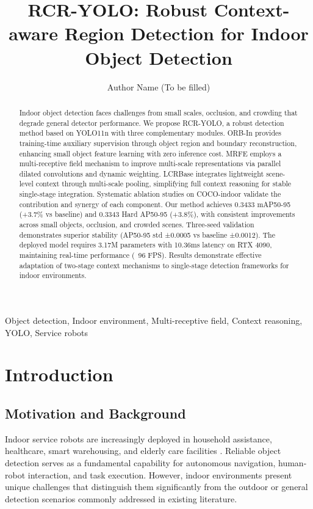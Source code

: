 \documentclass[journal]{IEEEtran}
\title{RCR-YOLO: Robust Context-aware Region Detection for Indoor Object Detection}
\author{Author Name (To be filled)}
\begin{document}
\maketitle

\begin{abstract}
Indoor object detection faces challenges from small scales, occlusion, and crowding that degrade general detector performance. We propose RCR-YOLO, a robust detection method based on YOLO11n with three complementary modules. ORB-In provides training-time auxiliary supervision through object region and boundary reconstruction, enhancing small object feature learning with zero inference cost. MRFE employs a multi-receptive field mechanism to improve multi-scale representations via parallel dilated convolutions and dynamic weighting. LCRBase integrates lightweight scene-level context through multi-scale pooling, simplifying full context reasoning for stable single-stage integration. Systematic ablation studies on COCO-indoor validate the contribution and synergy of each component. Our method achieves 0.3433 mAP50-95 (+3.7\% vs baseline) and 0.3343 Hard AP50-95 (+3.8\%), with consistent improvements across small objects, occlusion, and crowded scenes. Three-seed validation demonstrates superior stability (AP50-95 std ±0.0005 vs baseline ±0.0012). The deployed model requires 3.17M parameters with 10.36ms latency on RTX 4090, maintaining real-time performance (~96 FPS). Results demonstrate effective adaptation of two-stage context mechanisms to single-stage detection frameworks for indoor environments.
\end{abstract}

\begin{IEEEkeywords}
Object detection, Indoor environment, Multi-receptive field, Context reasoning, YOLO, Service robots
\end{IEEEkeywords}

\section{Introduction}
\label{sec:introduction}

\subsection{Motivation and Background}

Indoor service robots are increasingly deployed in household assistance, healthcare, smart warehousing, and elderly care facilities \cite{service_robot1,service_robot2}. Reliable object detection serves as a fundamental capability for autonomous navigation, human-robot interaction, and task execution. However, indoor environments present unique challenges that distinguish them significantly from the outdoor or general detection scenarios commonly addressed in existing literature.
\end{document}
